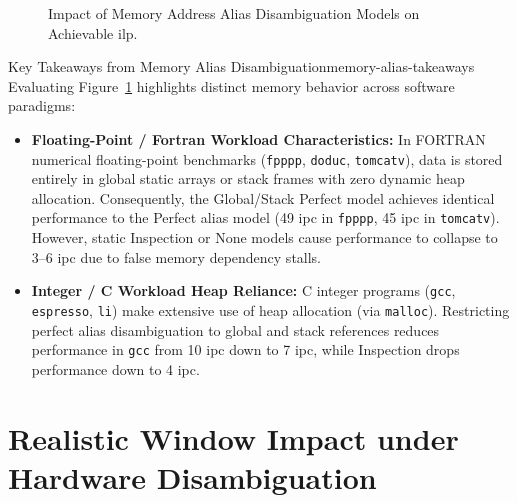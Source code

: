 \begin{figure}[htpb]
\caption{Impact of Memory Address Alias Disambiguation Models on Achievable \gls{ilp}.}
\label{fig:ilp_memory_alias_impact}
\end{figure}

\begin{observation}{Key Takeaways from Memory Alias Disambiguation}{memory-alias-takeaways}
Evaluating Figure~\ref{fig:ilp_memory_alias_impact} highlights distinct memory behavior across software paradigms:
\begin{itemize}
    \item \textbf{Floating-Point / Fortran Workload Characteristics:} In FORTRAN numerical floating-point benchmarks (\texttt{fpppp}, \texttt{doduc}, \texttt{tomcatv}), data is stored entirely in global static arrays or stack frames with zero dynamic heap allocation. Consequently, the Global/Stack Perfect model achieves identical performance to the Perfect alias model (49 \gls{ipc} in \texttt{fpppp}, 45 \gls{ipc} in \texttt{tomcatv}). However, static Inspection or None models cause performance to collapse to 3--6 \gls{ipc} due to false memory dependency stalls.
    \item \textbf{Integer / C Workload Heap Reliance:} C integer programs (\texttt{gcc}, \texttt{espresso}, \texttt{li}) make extensive use of heap allocation (via \texttt{malloc}). Restricting perfect alias disambiguation to global and stack references reduces performance in \texttt{gcc} from 10 \gls{ipc} down to 7 \gls{ipc}, while Inspection drops performance down to 4 \gls{ipc}.
\end{itemize}
\end{observation}

\section{Realistic Window Impact under Hardware Disambiguation}
\label{sec:realistic_window_impact}

